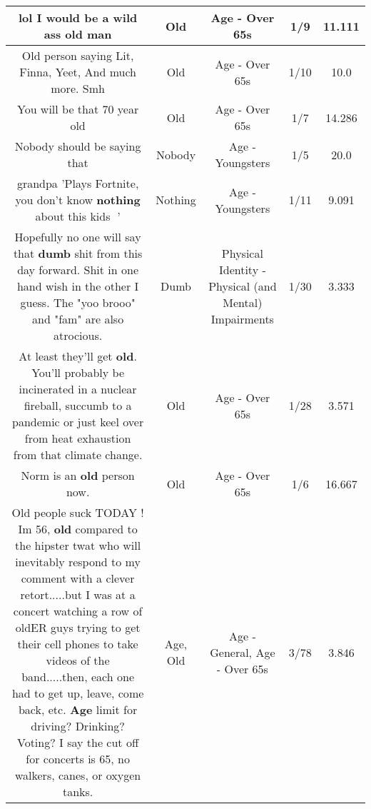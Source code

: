 \documentclass[11pt]{article}
\newlength\mylength
\begin{document}
\begin{center}
\begin{longtable}{|C{.65\mylength}|C{.30\mylength}|C{.12\mylength}|C{.12\mylength}|C{.12\mylength}|}
  \small lol I would be a wild ass \textbf{old} man\normalsize   & Old & Age - Over 65s & 1/9 & 11.111 \\  \hline
  \small Old person saying Lit, Finna, Yeet, And much more. Smh\normalsize   & Old & Age - Over 65s & 1/10 & 10.0 \\  \hline
  \small You will be that 70 year old\normalsize   & Old & Age - Over 65s & 1/7 & 14.286 \\  \hline
  \small Nobody should be saying that\normalsize   & Nobody & Age - Youngsters & 1/5 & 20.0 \\  \hline
  \small grandpa 'Plays Fortnite, you don't know \textbf{nothing} about  this kids 🥴'\normalsize   & Nothing & Age - Youngsters & 1/11 & 9.091 \\  \hline
  \small Hopefully no one will say that \textbf{dumb} shit from this day forward. Shit in one hand wish in the other I guess. The "yoo brooo" and "fam" are also atrocious.\normalsize   & Dumb & Physical Identity - Physical (and Mental) Impairments & 1/30 & 3.333 \\  \hline
  \small At least they'll get \textbf{old}.  You'll probably be incinerated in a nuclear fireball, succumb to a pandemic or just keel over from heat exhaustion from that climate change.\normalsize   & Old & Age - Over 65s & 1/28 & 3.571 \\  \hline
  \small Norm is an \textbf{old} person now.\normalsize   & Old & Age - Over 65s & 1/6 & 16.667 \\  \hline
  \small Old people suck TODAY !    Im 56, \textbf{old} compared to the hipster twat who will inevitably respond to my comment with a clever retort.....but I was at a concert watching a row of oldER guys trying to get their cell phones to take videos of the band.....then, each one had to get up, leave, come back, etc. \textbf{Age} limit for driving?  Drinking?  Voting? I say the cut off for concerts is 65, no walkers, canes, or oxygen tanks.\normalsize   & Age, Old & Age - General, Age - Over 65s & 3/78 & 3.846 \\  \hline

\end{longtable}
\end{center}
\end{document}

